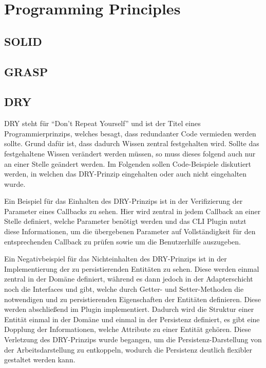 \chapter{Programming Principles}

\section{SOLID}

\section{GRASP}

\section{DRY}
DRY steht für \enquote{Don't Repeat Yourself} und ist der Titel eines Programmierprinzips, welches besagt, dass redundanter Code vermieden werden sollte. Grund dafür ist, dass dadurch Wissen zentral festgehalten wird. Sollte das festgehaltene Wissen verändert werden müssen, so muss dieses folgend auch nur an einer Stelle geändert werden. Im Folgenden sollen Code-Beispiele diskutiert werden, in welchen das DRY-Prinzip eingehalten oder auch nicht eingehalten wurde.

Ein Beispiel für das Einhalten des DRY-Prinzips ist in der Verifizierung der Parameter eines Callbacks zu sehen. Hier wird zentral in jedem Callback an einer Stelle definiert, welche Parameter benötigt werden und das CLI Plugin nutzt diese Informationen, um die übergebenen Parameter auf Vollständigkeit für den entsprechenden Callback zu prüfen sowie um die Benutzerhilfe auszugeben.

Ein Negativbeispiel für das Nichteinhalten des DRY-Prinzips ist in der Implementierung der zu persistierenden Entitäten zu sehen. Diese werden einmal zentral in der Domäne definiert, während es dann jedoch in der Adapterschicht noch die Interfaces  und  gibt, welche durch Getter- und Setter-Methoden die notwendigen und zu persistierenden Eigenschaften der Entitäten definieren. Diese werden abschließend im  Plugin implementiert. Dadurch wird die Struktur einer Entität einmal in der Domäne und einmal in der Persistenz definiert, es gibt eine Dopplung der Informationen, welche Attribute zu einer Entität gehören. Diese Verletzung des DRY-Prinzips wurde begangen, um die Persistenz-Darstellung von der Arbeitsdarstellung zu entkoppeln, wodurch die Persistenz deutlich flexibler gestaltet werden kann.

